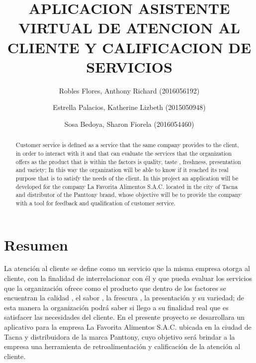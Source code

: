 \documentclass[preprint,12pt]{elsarticle}
\begin{document}
	
	\begin{frontmatter}

		\title{\huge  APLICACION ASISTENTE VIRTUAL DE ATENCION AL CLIENTE Y CALIFICACION DE SERVICIOS}
		
		\author{Robles Flores, Anthony Richard	                (2016056192)}
		\author{Estrella Palacios, Katherine Lizbeth			(2015050948)}
		\author{Sosa Bedoya, Sharon Fiorela				(2016054460)}
		\address{Tacna, Perú}
		
		\address{Tacna, Perú}
		
		\begin{abstract}
Customer service is defined as a service that the same company provides to the client, in order to interact with it and that can evaluate the services that the organization offers as the product that is within the factors is quality, taste , freshness, presentation and variety; In this way the organization will be able to know if it reached its real purpose that is to satisfy the needs of the client. In this project an application will be developed for the company La Favorita Alimentos S.A.C. located in the city of Tacna and distributor of the Panttony brand, whose objective will be to provide the company with a tool for feedback and qualification of customer service.
		\end{abstract}
\end{frontmatter}

\section{Resumen}
La atención al cliente se define como un servicio que la misma empresa otorga al cliente, con la finalidad de interrelacionar con él y que pueda evaluar los servicios que la organización ofrece como el producto que dentro de los factores se encuentran la calidad , el sabor , la frescura , la presentación y su variedad; de esta  manera la organización podrá saber si llego a su finalidad real que es satisfacer las necesidades del cliente. En el presente proyecto se desarrollara un aplicativo para la empresa La Favorita Alimentos S.A.C. ubicada en la ciudad de Tacna y distribuidora de la marca Panttony, cuyo objetivo será brindar a la empresa una herramienta de retroalimentación y calificación de la atención al cliente.
\end{document}

